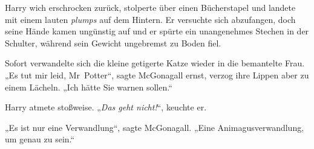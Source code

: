 Harry wich erschrocken zurück, stolperte über einen Bücherstapel und landete mit einem lauten \emph{plumps} auf dem Hintern. Er versuchte sich abzufangen, doch seine Hände kamen ungünstig auf und er spürte ein unangenehmes Stechen in der Schulter, während sein Gewicht ungebremst zu Boden fiel.

Sofort verwandelte sich die kleine getigerte Katze wieder in die bemantelte Frau. „Es tut mir leid, Mr~Potter“, sagte McGonagall ernst, verzog ihre Lippen aber zu einem Lächeln. „Ich hätte Sie warnen sollen.“

Harry atmete stoßweise. „\emph{Das geht nicht!}“, keuchte er.

„Es ist nur eine Verwandlung“, sagte McGonagall. „Eine Animagusverwandlung, um genau zu sein.“

